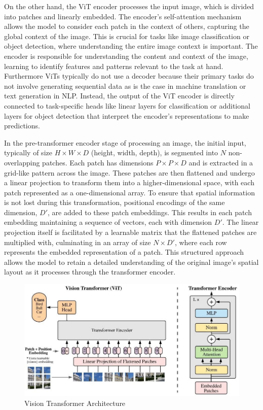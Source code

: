 \newpage
On the other hand, the ViT encoder processes the input image, which is divided into patches and linearly embedded. The encoder's self-attention mechanism 
allows the model to consider each patch in the context of others, capturing the global context of the image. This is crucial for tasks like image 
classification or object detection, where understanding the entire image context is important. The encoder is responsible for understanding the content and 
context of the image, learning to identify features and patterns relevant to the task at hand. Furthermore ViTs typically do not use a decoder because their 
primary tasks do not involve generating sequential data as is the case in machine translation or text generation in NLP. Instead, the output of the ViT 
encoder is directly connected to task-specific heads like linear layers for classification or additional layers for object detection that interpret the 
encoder's representations to make predictions.

In the pre-transformer encoder stage of processing an image, the initial input, typically of size \(H \times W \times D\) (height, width, depth), 
is segmented into \(N\) non-overlapping patches. Each patch has dimensions \(P \times P \times D\) and is extracted in a grid-like pattern across 
the image. These patches are then flattened and undergo a linear projection to transform them into a higher-dimensional space, with each patch represented 
as a one-dimensional array. To ensure that spatial information is not lost during this transformation, positional encodings of the same dimension, 
\(D'\), are added to these patch embeddings. This results in each patch embedding maintaining a sequence of vectors, each with dimension \(D'\). 
The linear projection itself is facilitated by a learnable matrix that the flattened patches are multiplied with, culminating in an array of size 
\(N \times D'\), where each row represents the embedded representation of a patch. This structured approach allows the model to retain a detailed 
understanding of the original image’s spatial layout as it processes through the transformer encoder.


\begin{figure}[h!]
    \centering
    \includegraphics[scale=0.45]{Figures/vision-transformer.jpg}
    \caption{Vision Transformer Architecture}
    \label{fig:tr-vit}
\end{figure}


